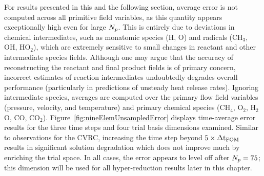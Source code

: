For results presented in this and the following section, average error is not computed across all primitive field variables, as this quantity appears exceptionally high even for large $N_p$. This is entirely due to deviations in chemical intermediates, such as monatomic species (H, O) and radicals (CH$_3$, OH, HO$_2$), which are extremely sensitive to small changes in reactant and other intermediate species fields. Although one may argue that the accuracy of reconstructing the reactant and final product fields is of primary concern, incorrect estimates of reaction intermediates undoubtedly degrades overall performance (particularly in predictions of unsteady heat release rates). Ignoring intermediate species, averages are computed over the primary flow field variables (pressure, velocity, and temperature) and primary chemical species (CH$_4$, O$_2$, H$_2$O, CO, CO$_2$). Figure~\ref{fig:nineElemUnsampledError} displays time-average error results for the three time steps and four trial basis dimensions examined. Similar to observations for the CVRC, increasing the time step beyond $5 \times \Delta \text{t}_{\text{FOM}}$ results in significant solution degradation which does not improve much by enriching the trial space. In all cases, the error appears to level off after $N_p = 75$; this dimension will be used for all hyper-reduction results later in this chapter.

